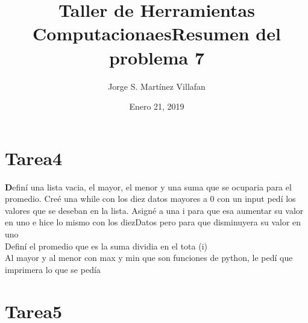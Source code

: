 \documentclass[letterpaper, 12pt, oneside]{article}%
\title{\Huge Taller de Herramientas Computacionaes}
\author{Jorge S. Martínez Villafan}
\date{Enero 21, 2019}
\begin{document}
\maketitle
\newpage
\title{Resumen del problema 7}
\section{Tarea4}
\textbf Definí una lista vacia, el mayor, el menor  y una suma que se ocuparia para el promedio. Creé una while con los diez datos mayores a 0 con un input pedí los valores que se deseban en la lista. Asigné a una i para que esa aumentar su valor en uno e hice lo mismo con los diezDatos pero para que disminuyera su valor en uno\\
Definí el promedio que es la suma dividia en el tota (i)
\\Al mayor y al menor con max y min que son funciones de python, le pedí que imprimera lo que se pedía
\section{Tarea5}
\end{document}
